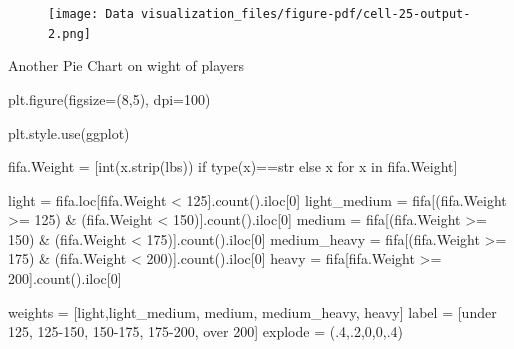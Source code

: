 \documentclass[
  letterpaper,
  DIV=11,
  numbers=noendperiod]{scrreprt}
\newenvironment{Shaded}{\begin{snugshade}}{\end{snugshade}}
\newcommand{\BuiltInTok}[1]{\textcolor[rgb]{0.00,0.23,0.31}{#1}}
\newcommand{\ControlFlowTok}[1]{\textcolor[rgb]{0.00,0.23,0.31}{#1}}
\newcommand{\DecValTok}[1]{\textcolor[rgb]{0.68,0.00,0.00}{#1}}
\newcommand{\FloatTok}[1]{\textcolor[rgb]{0.68,0.00,0.00}{#1}}
\newcommand{\KeywordTok}[1]{\textcolor[rgb]{0.00,0.23,0.31}{#1}}
\newcommand{\NormalTok}[1]{\textcolor[rgb]{0.00,0.23,0.31}{#1}}
\newcommand{\OperatorTok}[1]{\textcolor[rgb]{0.37,0.37,0.37}{#1}}
\newcommand{\StringTok}[1]{\textcolor[rgb]{0.13,0.47,0.30}{#1}}
\begin{document}
\begin{figure}[H]

{\centering \texttt{[image: Data visualization\_files/figure-pdf/cell-25-output-2.png]}

}

\end{figure}

Another Pie Chart on wight of players

\begin{Shaded}
\begin{Highlighting}[]
\NormalTok{plt.figure(figsize}\OperatorTok{=}\NormalTok{(}\DecValTok{8}\NormalTok{,}\DecValTok{5}\NormalTok{), dpi}\OperatorTok{=}\DecValTok{100}\NormalTok{)}

\NormalTok{plt.style.use(}\StringTok{\textquotesingle{}ggplot\textquotesingle{}}\NormalTok{)}

\NormalTok{fifa.Weight }\OperatorTok{=}\NormalTok{ [}\BuiltInTok{int}\NormalTok{(x.strip(}\StringTok{\textquotesingle{}lbs\textquotesingle{}}\NormalTok{)) }\ControlFlowTok{if} \BuiltInTok{type}\NormalTok{(x)}\OperatorTok{==}\BuiltInTok{str} \ControlFlowTok{else}\NormalTok{ x }\ControlFlowTok{for}\NormalTok{ x }\KeywordTok{in}\NormalTok{ fifa.Weight]}

\NormalTok{light }\OperatorTok{=}\NormalTok{ fifa.loc[fifa.Weight }\OperatorTok{\textless{}} \DecValTok{125}\NormalTok{].count().iloc[}\DecValTok{0}\NormalTok{]}
\NormalTok{light\_medium }\OperatorTok{=}\NormalTok{ fifa[(fifa.Weight }\OperatorTok{\textgreater{}=} \DecValTok{125}\NormalTok{) }\OperatorTok{\&}\NormalTok{ (fifa.Weight }\OperatorTok{\textless{}} \DecValTok{150}\NormalTok{)].count().iloc[}\DecValTok{0}\NormalTok{]}
\NormalTok{medium }\OperatorTok{=}\NormalTok{ fifa[(fifa.Weight }\OperatorTok{\textgreater{}=} \DecValTok{150}\NormalTok{) }\OperatorTok{\&}\NormalTok{ (fifa.Weight }\OperatorTok{\textless{}} \DecValTok{175}\NormalTok{)].count().iloc[}\DecValTok{0}\NormalTok{]}
\NormalTok{medium\_heavy }\OperatorTok{=}\NormalTok{ fifa[(fifa.Weight }\OperatorTok{\textgreater{}=} \DecValTok{175}\NormalTok{) }\OperatorTok{\&}\NormalTok{ (fifa.Weight }\OperatorTok{\textless{}} \DecValTok{200}\NormalTok{)].count().iloc[}\DecValTok{0}\NormalTok{]}
\NormalTok{heavy }\OperatorTok{=}\NormalTok{ fifa[fifa.Weight }\OperatorTok{\textgreater{}=} \DecValTok{200}\NormalTok{].count().iloc[}\DecValTok{0}\NormalTok{]}

\NormalTok{weights }\OperatorTok{=}\NormalTok{ [light,light\_medium, medium, medium\_heavy, heavy]}
\NormalTok{label }\OperatorTok{=}\NormalTok{ [}\StringTok{\textquotesingle{}under 125\textquotesingle{}}\NormalTok{, }\StringTok{\textquotesingle{}125{-}150\textquotesingle{}}\NormalTok{, }\StringTok{\textquotesingle{}150{-}175\textquotesingle{}}\NormalTok{, }\StringTok{\textquotesingle{}175{-}200\textquotesingle{}}\NormalTok{, }\StringTok{\textquotesingle{}over 200\textquotesingle{}}\NormalTok{]}
\NormalTok{explode }\OperatorTok{=}\NormalTok{ (}\FloatTok{.4}\NormalTok{,}\FloatTok{.2}\NormalTok{,}\DecValTok{0}\NormalTok{,}\DecValTok{0}\NormalTok{,}\FloatTok{.4}\NormalTok{)}


\end{Highlighting}
\end{Shaded}
\end{document}
